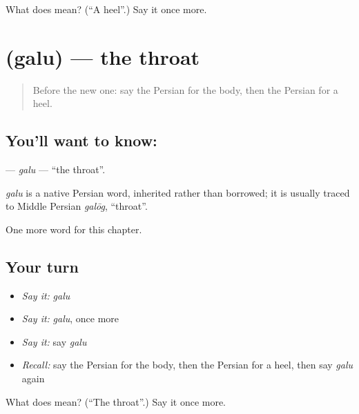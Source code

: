 \begin{tcolorbox}[breakable,colback=teal!4,colframe=teal!35!black,title={Before you move on}]
What does  mean? (\textquotedblleft{}A heel\textquotedblright{}.) Say it once more.
\end{tcolorbox}
\section[\texorpdfstring{\fa{گلو} (galu)}{گلو (galu)}]{ (galu) — the throat}

\label{lesson:FA-C150-galu}



\begin{quote}
Before the new one: say the Persian for the body, then the Persian for a heel.
\end{quote}

\subsection*{You'll want to know: }
\textbf{} — \emph{galu} — \textquotedblleft{}the throat\textquotedblright{}.

\begin{cousinweb}
\emph{galu} is a native Persian word, inherited rather than borrowed; it is usually traced to Middle Persian \emph{galōg}, \textquotedblleft{}throat\textquotedblright{}.
\end{cousinweb}

\begin{grammarlens}[title={What you've built}]
One more word for this chapter.
\end{grammarlens}

\subsection*{Your turn}
\begin{itemize}
\raggedright
  \item \emph{Say it:} \emph{galu}
  \item \emph{Say it:} \emph{galu}, once more
  \item \emph{Say it:} say \emph{galu}
  \item \emph{Recall:} say the Persian for the body, then the Persian for a heel, then say \emph{galu} again
\end{itemize}

\begin{tcolorbox}[breakable,colback=teal!4,colframe=teal!35!black,title={Before you move on}]
What does  mean? (\textquotedblleft{}The throat\textquotedblright{}.) Say it once more.
\end{tcolorbox}
